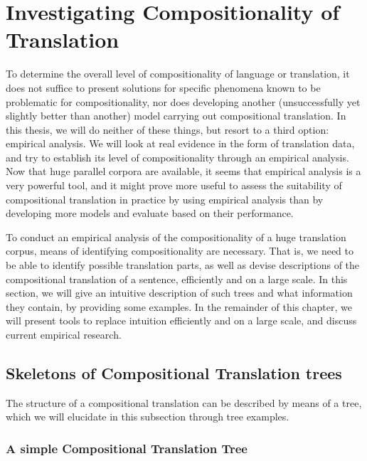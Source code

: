  
\section{Investigating Compositionality of Translation}
\label{sec:invest}

To determine the overall level of compositionality of language or translation, it does not suffice to present solutions for specific phenomena known to be problematic for compositionality, nor does developing another (unsuccessfully yet slightly better than another) model carrying out compositional translation. In this thesis, we will do neither of these things, but resort to a third option: empirical analysis. We will look at real evidence in the form of translation data, and try to establish its level of compositionality through an empirical analysis. Now that huge parallel corpora are available, it seems that empirical analysis is a very powerful tool, and it might prove more useful to assess the suitability of compositional translation in practice by using empirical analysis than by developing more models and evaluate based on their performance.

To conduct an empirical analysis of the compositionality of a huge translation corpus, means of identifying compositionality are necessary. That is, we need to be able to identify possible translation parts, as well as devise descriptions of the compositional translation of a sentence, efficiently and on a large scale. In this section, we will give an intuitive description of such trees and what information they contain, by providing some examples. In the remainder of this chapter, we will present tools to replace intuition efficiently and on a large scale, and discuss current empirical research.

\subsection{Skeletons of Compositional Translation trees}

The structure of a compositional translation can be described by means of a tree, which we will elucidate in this subsection through tree examples.

\subsubsection{A simple Compositional Translation Tree}

